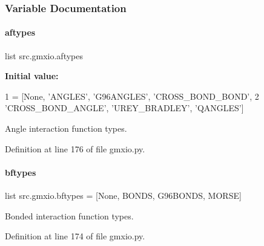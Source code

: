 \subsubsection{Variable Documentation}
\mbox{\label{namespacesrc_1_1gmxio_a88d279e65fc0870eb60d9a48b0e82da6}} 
\paragraph{\texorpdfstring{aftypes}{aftypes}}
{\footnotesize\ttfamily list src.\+gmxio.\+aftypes}

{\bfseries Initial value\+:}
\begin{DoxyCode}
1 =  [\textcolor{keywordtype}{None}, \textcolor{stringliteral}{'ANGLES'}, \textcolor{stringliteral}{'G96ANGLES'}, \textcolor{stringliteral}{'CROSS\_BOND\_BOND'},
2            \textcolor{stringliteral}{'CROSS\_BOND\_ANGLE'}, \textcolor{stringliteral}{'UREY\_BRADLEY'}, \textcolor{stringliteral}{'QANGLES'}]
\end{DoxyCode}


Angle interaction function types. 



Definition at line 176 of file gmxio.\+py.

\mbox{\label{namespacesrc_1_1gmxio_a1d9eaea45ad2ce4a5ad671480a896aa8}} 
\paragraph{\texorpdfstring{bftypes}{bftypes}}
{\footnotesize\ttfamily list src.\+gmxio.\+bftypes = \mbox{[}None, \textquotesingle{}B\+O\+N\+DS\textquotesingle{}, \textquotesingle{}G96\+B\+O\+N\+DS\textquotesingle{}, \textquotesingle{}M\+O\+R\+SE\textquotesingle{}\mbox{]}}



Bonded interaction function types. 



Definition at line 174 of file gmxio.\+py.

\mbox{\label{namespacesrc_1_1gmxio_a35a8bc876463670e6c8c7342d9653f1f}} 
